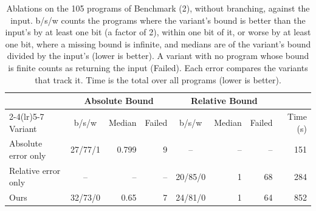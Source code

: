 \begin{table}[H] \centering \small
\caption{Ablations on the 105 programs of Benchmark (2), without branching, against the input. b/s/w counts the programs where the variant's bound is better than the input's by at least one bit (a factor of 2), within one bit of it, or worse by at least one bit, where a missing bound is infinite, and medians are of the variant's bound divided by the input's (lower is better). A variant with no program whose bound is finite counts as returning the input (Failed). Each error compares the variants that track it. Time is the total over all programs (lower is better).}\label{tab:ablation}
\begin{tabular}{lcrrcrrr}
\toprule
& \multicolumn{3}{c}{Absolute Bound} & \multicolumn{3}{c}{Relative Bound} & \\
\cmidrule(lr){2-4}\cmidrule(lr){5-7}
Variant & b/s/w & Median & Failed & b/s/w & Median & Failed & Time (s) \\
\midrule
Absolute error only & 27/77/1 & 0.799 & 9 & -- & -- & -- & 151 \\
Relative error only & -- & -- & -- & 20/85/0 & 1 & 68 & 284 \\
Ours & 32/73/0 & 0.65 & 7 & 24/81/0 & 1 & 64 & 852 \\
\bottomrule
\end{tabular}
\end{table}
